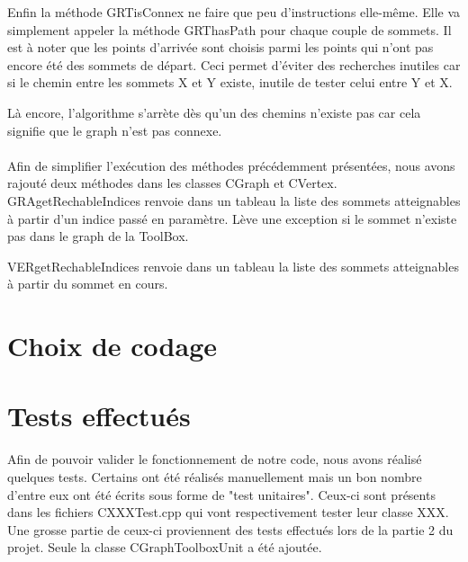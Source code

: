 		Enfin la méthode GRTisConnex ne faire que peu d'instructions elle-même. Elle va simplement appeler la méthode GRThasPath pour chaque couple de sommets. Il est à noter que les points d'arrivée sont choisis parmi les points qui n'ont pas encore été des sommets de départ. Ceci permet d'éviter des recherches inutiles car si le chemin entre les sommets X et Y existe, inutile de tester celui entre Y et X.
		
		Là encore, l'algorithme s'arrète dès qu'un des chemins n'existe pas car cela signifie que le graph n'est pas connexe.\\\\
		
		Afin de simplifier l'exécution des méthodes précédemment présentées, nous avons rajouté deux méthodes dans les classes CGraph et CVertex.\\
		
		GRAgetRechableIndices renvoie dans un tableau la liste des sommets atteignables à partir d'un indice passé en paramètre. Lève une exception si le sommet n'existe pas dans le graph de la ToolBox.
		
		VERgetRechableIndices renvoie dans un tableau la liste des sommets atteignables à partir du sommet en cours.
		
		\newpage
		
	\chapter{Choix de codage}
		
		
		
	\chapter{Tests effectués}
		Afin de pouvoir valider le fonctionnement de notre code, nous avons réalisé quelques tests. Certains ont été réalisés manuellement mais un bon nombre d'entre eux ont été écrits sous forme de "test unitaires". Ceux-ci sont présents dans les fichiers CXXXTest.cpp qui vont respectivement tester leur classe XXX. Une grosse partie de ceux-ci proviennent des tests effectués lors de la partie 2 du projet. Seule la classe CGraphToolboxUnit a été ajoutée.
		
